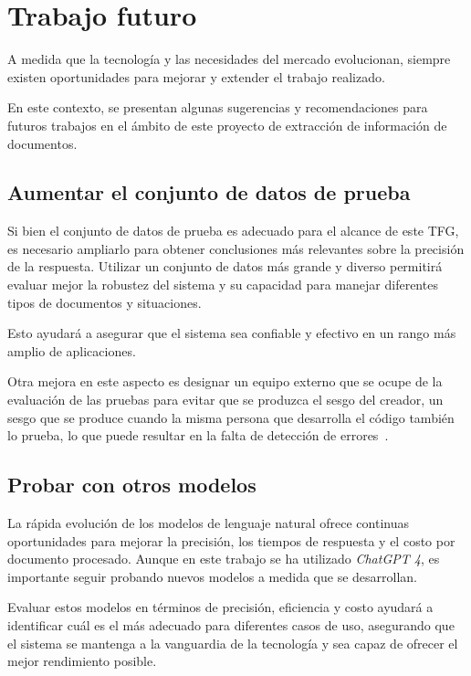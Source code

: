 \section{Trabajo futuro}

A medida que la tecnología y las necesidades del mercado evolucionan, siempre existen oportunidades para mejorar y
extender el trabajo realizado.

En este contexto, se presentan algunas sugerencias y recomendaciones para futuros trabajos en el ámbito de este proyecto
de extracción de información de documentos.

\subsection*{Aumentar el conjunto de datos de prueba}

Si bien el conjunto de datos de prueba es adecuado para el alcance de este TFG, es necesario ampliarlo para obtener
conclusiones más relevantes sobre la precisión de la respuesta.
Utilizar un conjunto de datos más grande y diverso permitirá evaluar mejor la robustez del sistema y su capacidad para
manejar diferentes tipos de documentos y situaciones.

Esto ayudará a asegurar que el sistema sea confiable y efectivo en un rango más amplio de aplicaciones.

Otra mejora en este aspecto es designar un equipo externo que se ocupe de la evaluación de las pruebas para evitar que
se produzca el sesgo del creador, un sesgo que se produce cuando la misma persona que desarrolla el código también lo
prueba, lo que puede resultar en la falta de detección de errores~\cite{url_test_io_bias_software_testing}.

\subsection*{Probar con otros modelos}

La rápida evolución de los modelos de lenguaje natural ofrece continuas oportunidades para mejorar la precisión, los
tiempos de respuesta y el costo por documento procesado.
Aunque en este trabajo se ha utilizado \textit{ChatGPT 4}, es importante seguir probando nuevos modelos a medida que se
desarrollan.

Evaluar estos modelos en términos de precisión, eficiencia y costo ayudará a identificar cuál es el más adecuado para
diferentes casos de uso, asegurando que el sistema se mantenga a la vanguardia de la tecnología y sea capaz de ofrecer
el mejor rendimiento posible.

